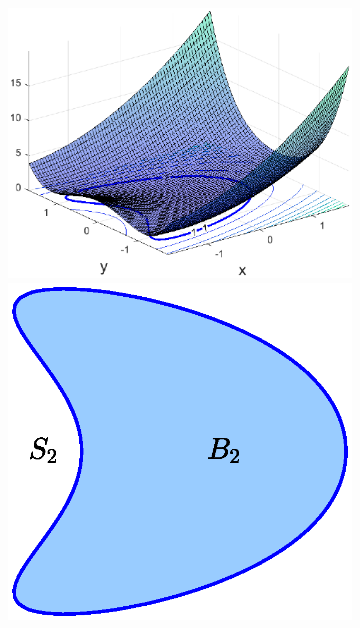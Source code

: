 \documentclass[11pt, letter]{book}
\newenvironment{example}
  {\pushQED{\qed}\renewcommand{\qedsymbol}{$\triangle$}\examplex}
  {\popQED\endexamplex}
\begin{document}
\begin{example}
\begin{figure}[!htb]
\begin{subfigure}{0.5\textwidth}
    \end{subfigure}%
    \hspace{-20pt}
    \begin{subfigure}{0.5\textwidth}
    \centering
    \includegraphics[scale=0.6]{Fig1c.eps}
    \vspace{-10pt}
    \includegraphics[scale=0.6]{Fig1d.eps}

\end{subfigure}
\end{figure}
\end{example}
\end{document}
